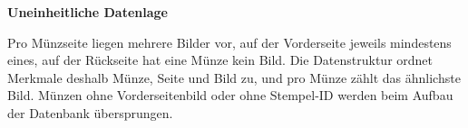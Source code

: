\vspace{\baselineskip}

\noindent \textbf{Uneinheitliche Datenlage}

\noindent Pro Münzseite liegen mehrere Bilder vor, auf der Vorderseite jeweils mindestens eines, auf der Rückseite hat eine Münze kein Bild. Die Datenstruktur ordnet Merkmale deshalb Münze, Seite und Bild zu, und pro Münze zählt das ähnlichste Bild. Münzen ohne Vorderseitenbild oder ohne Stempel-ID werden beim Aufbau der Datenbank übersprungen.